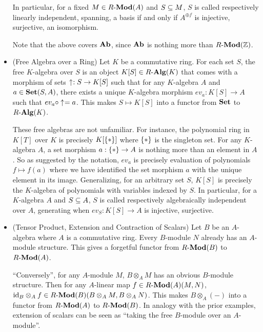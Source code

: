 \begin{eg}
\begin{itemize}
    In particular, for a fixed $M \in R\text{-}\mathbf{Mod}(A)$ and $S \subseteq M$,
    $S$ is called respectively linearly independent, spanning, a basis
    if and only if $A^{\oplus f}$ is injective, surjective, an isomorphism.

    Note that the above covers $\mathbf{Ab}$, since 
    $\mathbf{Ab}$ is nothing more than $R\text{-}\mathbf{Mod}(\mathbb{Z})$.

    \item (Free Algebra over a Ring)
    Let $K$ be a commutative ring. 
    For each set $S$, 
    the free $K$-algebra over $S$ is an object $K[S] \in R\text{-}\mathbf{Alg}(K)$
    that comes with a morphism of sets $\uparrow_{}^{} : S \to K[S]$ such that
    for any $K$-algebra $A$ and $a \in \mathbf{Set}(S,A)$,
    there exists a unique $K$-algebra morphism $ev_a : K[S] \to A$
    such that $ev_a \circ \uparrow_{}^{} = a$.
    This makes $S \mapsto K[S]$ into a functor 
    from $\mathbf{Set}$ to $R\text{-}\mathbf{Alg}(K)$.

    These free algebras are not unfamiliar.
    For instance, 
    the polynomial ring in $K[T]$ over $K$ is
    precisely $K[\left\{*\right\}]$ where $\left\{*\right\}$ is the singleton set.
    For any $K$-algebra $A$,
    a set morphism $a : \left\{*\right\} \to A$ is nothing more than
    an element in $A$.
    So as suggested by the notation, $ev_a$ is precisely evaluation 
    of polynomials $f \mapsto f(a)$ where we have identified 
    the set morphism $a$ with the unique element in its image. 
    Generalizing, for an arbitrary set $S$,
    $K[S]$ is precisely the $K$-algebra of polynomials 
    with variables indexed by $S$. 
    In particular, for a $K$-algebra $A$ and $S \subseteq A$,
    $S$ is called respectively algebraically independent over $A$, generating
    when $ev_S : K[S] \to A$ is injective, surjective. 

    \item (Tensor Product, Extension and Contraction of Scalars)
    Let $B$ be an $A$-algebra where $A$ is a commutative ring. 
    Every $B$-module $N$ already has an $A$-module structure. 
    This gives a forgetful functor from $R\text{-}\mathbf{Mod}(B)$ to $R\text{-}\mathbf{Mod}(A)$.

    ``Conversely'', for any $A$-module $M$, 
    $B \otimes_A M$ has an obvious $B$-module structure.
    Then for any $A$-linear map $f \in R\text{-}\mathbf{Mod}(A)(M,N)$, 
    $\mathrm{id}_{B} \otimes_A f \in R\text{-}\mathbf{Mod}(B)(B\otimes_A M, B\otimes_A N)$.
    This makes $B \otimes_A (-)$ into a functor from 
    $R\text{-}\mathbf{Mod}(A)$ to $R\text{-}\mathbf{Mod}(B)$.
    In analogy with the prior examples,
    extension of scalars can be seen as 
    ``taking the free $B$-module over an $A$-module''.


\end{itemize}
\end{eg}
